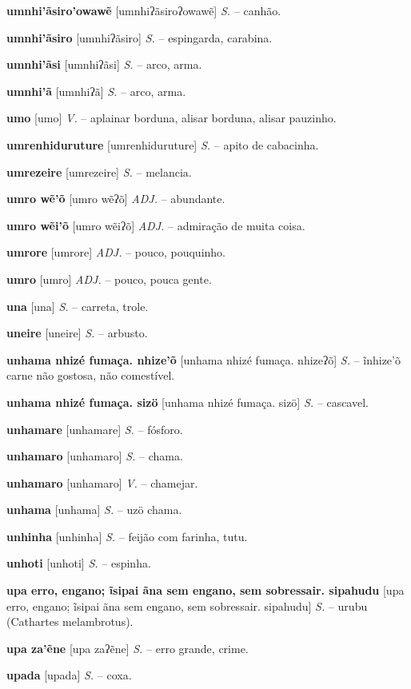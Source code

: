 \textbf{umnhi'ãsiro'owawẽ} [umnhiʔãsiroʔowawẽ] \textit{S.} -- canhão.

\textbf{umnhi'ãsiro} [umnhiʔãsiro] \textit{S.} -- espingarda, carabina.

\textbf{umnhi'ãsi} [umnhiʔãsi] \textit{S.} -- arco, arma.

\textbf{umnhi'ã} [umnhiʔã] \textit{S.} -- arco, arma.

\textbf{umo} [umo] \textit{V.} -- aplainar borduna, alisar borduna, alisar pauzinho.

\textbf{umrenhiduruture} [umrenhiduruture] \textit{S.} -- apito de cabacinha.

\textbf{umrezeire} [umrezeire] \textit{S.} -- melancia.

\textbf{umro wẽ'õ} [umro wẽʔõ] \textit{ADJ.} -- abundante.

\textbf{umro wẽi'õ} [umro wẽiʔõ] \textit{ADJ.} -- admiração de muita coisa.

\textbf{umrore} [umrore] \textit{ADJ.} -- pouco, pouquinho.

\textbf{umro} [umro] \textit{ADJ.} -- pouco, pouca gente.

\textbf{una} [una] \textit{S.} -- carreta, trole.

\textbf{uneire} [uneire] \textit{S.} -- arbusto.

\textbf{unhama nhizé fumaça. nhize'õ} [unhama nhizé fumaça. nhizeʔõ] \textit{S.} -- ĩnhize'õ carne não gostosa, não comestível.

\textbf{unhama nhizé fumaça. sizö} [unhama nhizé fumaça. sizö] \textit{S.} -- cascavel.

\textbf{unhamare} [unhamare] \textit{S.} -- fósforo.

\textbf{unhamaro} [unhamaro] \textit{S.} -- chama.

\textbf{unhamaro} [unhamaro] \textit{V.} -- chamejar.

\textbf{unhama} [unhama] \textit{S.} -- uzö chama.

\textbf{unhinha} [unhinha] \textit{S.} -- feijão com farinha, tutu.

\textbf{unhoti} [unhoti] \textit{S.} -- espinha.

\textbf{upa erro, engano; ĩsipai ãna sem engano, sem sobressair. sipahudu} [upa erro, engano; ĩsipai ãna sem engano, sem sobressair. sipahudu] \textit{S.} -- urubu (Cathartes melambrotus).

\textbf{upa za'ẽne} [upa zaʔẽne] \textit{S.} -- erro grande, crime.

\textbf{upada} [upada] \textit{S.} -- coxa.

